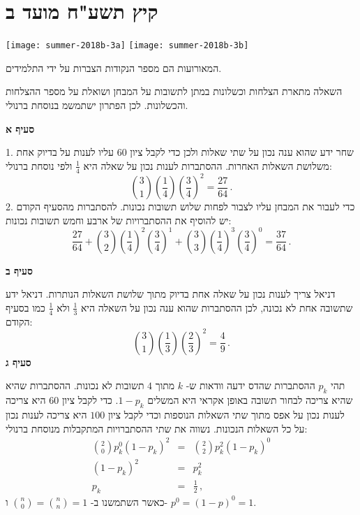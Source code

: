 

\section{קיץ תשע"ח מועד ב}

\begin{center}
\hspace*{8em}\texttt{[image: summer-2018b-3a]}
\hspace*{-2.2em}\texttt{[image: summer-2018b-3b]}
\end{center}

המאורועות הם מספר הנקודות הצברות על ידי התלמידים.

השאלה מתארת הצלחות וכשלונות במתן לתשובות על המבחן ושואלת על מספר ההצלחות והכשלונות. לכן הפתרון ישתמשמ בנוסחת ברנולי.

\textbf{סעיף א}

1. שחר ידע שהוא ענה נכון על שתי שאלות ולכן כדי לקבל ציון
$60$
עליו לענות על בדיוק אחת משלושת השאלות האחרות. ההסתברות לענות נכון על שאלה היא 
$\frac{1}{4}$
ולפי נוסחת ברנולי:
\[
{3 \choose 1}\left(\frac{1}{4}\right)\left(\frac{3}{4}\right)^2=\frac{27}{64}\,.
\]
2. כדי לעבור את המבחן עליו לצבור לפחות שלוש תשובות נכונות. להסתברות מהסעיף הקודם יש להוסיף את ההסתברויות של ארבע וחמש תשובות נכונות:
\[
\frac{27}{64}+{3 \choose 2}\left(\frac{1}{4}\right)^2\left(\frac{3}{4}\right)^1+{3 \choose 3}\left(\frac{1}{4}\right)^3\left(\frac{3}{4}\right)^0=\frac{37}{64}\,.
\]

\newpage

\textbf{סעיף ב}

דניאל צריך לענות נכון על שאלה אחת בדיוק מתוך שלושת השאלות הנותרות. דניאל ידע שתשובה אחת לא נכונה, לכן ההסתברות שהוא ענה נכון על השאלה היא
$\frac{1}{3}$
ולא 
$\frac{1}{4}$
כמו בסעיף הקודם:
\[
{3 \choose 1}\left(\frac{1}{3}\right)\left(\frac{2}{3}\right)^2=\frac{4}{9}\,.
\]
\textbf{סעיף ג}

תהי
$p_k$
ההסתברות שהדס ידעה וודאות ש-%
$k$
מתוך 
$4$
תשובות לא נכונות. ההסתברות שהיא שהיא צריכה לבחור תשובה באופן אקראי היא המשלים
$1-p_k$.
כדי לקבל ציון
$60$
היא צריכה לענות נכון על אפס מתוך שתי השאלות הנוספות וכדי לקבל ציון 
$100$
היא צריכה לענות נכון על כל השאלות הנכונות. נשווה את שתי ההסתברויות המתקבלות מנוסחת ברנולי:
\begin{eqnarray*}
{2 \choose 0}p_k^0(1-p_k)^2 &=& {2 \choose 2}p_k^2(1-p_k)^0\\
(1-p_k)^2 &=& p_k^2\\
p_k&=&\frac{1}{2}\,,
\end{eqnarray*}
כאשר השתמשנו ב-%
${n\choose 0}={n\choose n}=1$
ו-%
$p^0=(1-p)^0=1$.

